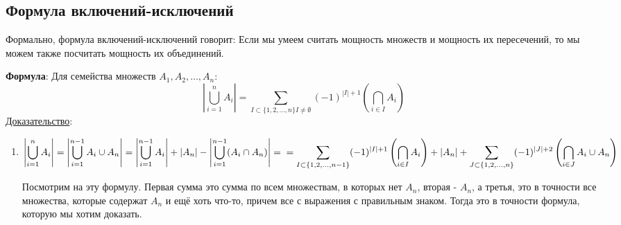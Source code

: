 \subsection{Формула включений-исключений}
Формально, формула включений-исключений говорит: Если мы умеем считать мощность множеств и мощность их пересечений, то мы можем также посчитать мощность их объединений.

\textbf{Формула}: Для семейства множеств $A_1, A_2, \dots, A_n$: $$\left|\bigcup\limits_{i=1}^{n}A_i\right|=\sum\limits_{I\subset \{1, 2,\dots,n\} I \neq \emptyset}(-1)^{|I|+1}\left(\bigcap\limits_{i\in I}A_i\right)$$
\uline{Доказательство}:
\begin{enumerate}
    \item[] $\displaystyle\left|\bigcup\limits_{i=1}^{n}A_i\right|=\left|\bigcup\limits_{i=1}^{n - 1}A_i \cup A_n\right| = \left|\bigcup\limits_{i=1}^{n - 1}A_i\right| + \left|A_n\right| - \left|\bigcup\limits_{i=1}^{n - 1}(A_i\cap A_n)\right|=\\=\sum\limits_{I\subset \{1, 2,\dots,n-1\}}(-1)^{|I|+1}\left(\bigcap\limits_{i\in I}A_i\right)+|A_n|+\sum\limits_{J\subset \{1, 2,\dots,n\}}(-1)^{|J|+2}\left(\bigcap\limits_{i\in J}A_i\cup A_n\right)$
    
    Посмотрим на эту формулу. Первая сумма это сумма по всем множествам, в которых нет $A_n$, вторая - $A_n$, а третья, это в точности все множества, которые содержат $A_n$ и ещё хоть что-то, причем все с выражения с правильным знаком. Тогда это в точности формула, которую мы хотим доказать.
\end{enumerate}
